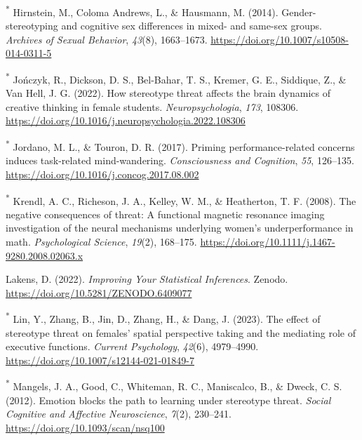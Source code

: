 \documentclass[
  stu,floatsintext]{apa7}
\newlength{\cslhangindent}
\newenvironment{CSLReferences}[2] %
 {\begin{list}{}{%
  \setlength{\itemindent}{0pt}
  \setlength{\leftmargin}{0pt}
  \setlength{\parsep}{0pt}
  \ifodd #1
   \setlength{\leftmargin}{\cslhangindent}
   \setlength{\itemindent}{-1\cslhangindent}
  \fi
  \setlength{\itemsep}{#2\baselineskip}}}
 {\end{list}}
\begin{document}
\begin{CSLReferences}{1}{0}
\textsuperscript{*} Hirnstein, M., Coloma Andrews, L., \& Hausmann, M. (2014). Gender-stereotyping and cognitive sex differences in mixed- and same-sex groups. \emph{Archives of Sexual Behavior}, \emph{43}(8), 1663--1673. \url{https://doi.org/10.1007/s10508-014-0311-5}

\textsuperscript{*} Jończyk, R., Dickson, D. S., Bel-Bahar, T. S., Kremer, G. E., Siddique, Z., \& Van Hell, J. G. (2022). How stereotype threat affects the brain dynamics of creative thinking in female students. \emph{Neuropsychologia}, \emph{173}, 108306. \url{https://doi.org/10.1016/j.neuropsychologia.2022.108306}

\textsuperscript{*} Jordano, M. L., \& Touron, D. R. (2017). Priming performance-related concerns induces task-related mind-wandering. \emph{Consciousness and Cognition}, \emph{55}, 126--135. \url{https://doi.org/10.1016/j.concog.2017.08.002}

\textsuperscript{*} Krendl, A. C., Richeson, J. A., Kelley, W. M., \& Heatherton, T. F. (2008). The negative consequences of threat: A functional magnetic resonance imaging investigation of the neural mechanisms underlying women's underperformance in math. \emph{Psychological Science}, \emph{19}(2), 168--175. \url{https://doi.org/10.1111/j.1467-9280.2008.02063.x}

Lakens, D. (2022). \emph{Improving {Your Statistical Inferences}}. Zenodo. \url{https://doi.org/10.5281/ZENODO.6409077}

\textsuperscript{*} Lin, Y., Zhang, B., Jin, D., Zhang, H., \& Dang, J. (2023). The effect of stereotype threat on females' spatial perspective taking and the mediating role of executive functions. \emph{Current Psychology}, \emph{42}(6), 4979--4990. \url{https://doi.org/10.1007/s12144-021-01849-7}

\textsuperscript{*} Mangels, J. A., Good, C., Whiteman, R. C., Maniscalco, B., \& Dweck, C. S. (2012). Emotion blocks the path to learning under stereotype threat. \emph{Social Cognitive and Affective Neuroscience}, \emph{7}(2), 230--241. \url{https://doi.org/10.1093/scan/nsq100}


\end{CSLReferences}
\end{document}
